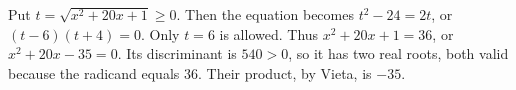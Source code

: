 Put $t=\sqrt{x^2+20x+1}\ge0$. Then the equation becomes $t^2-24=2t$, or $(t-6)(t+4)=0$. Only $t=6$ is allowed. Thus $x^2+20x+1=36$, or $x^2+20x-35=0$. Its discriminant is $540>0$, so it has two real roots, both valid because the radicand equals $36$. Their product, by Vieta, is $\boxed{-35}$.
